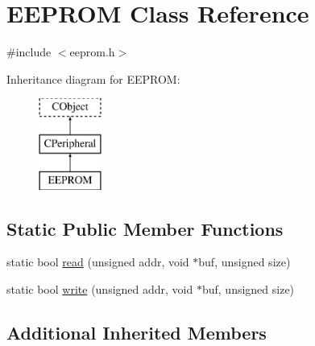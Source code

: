 \hypertarget{class_e_e_p_r_o_m}{\section{E\-E\-P\-R\-O\-M Class Reference}
\label{class_e_e_p_r_o_m}
}


{\ttfamily \#include $<$eeprom.\-h$>$}

Inheritance diagram for E\-E\-P\-R\-O\-M\-:\begin{figure}[H]
\begin{center}
\leavevmode
\includegraphics[height=3.000000cm]{d0/d7a/class_e_e_p_r_o_m}
\end{center}
\end{figure}
\subsection*{Static Public Member Functions}
\begin{DoxyCompactItemize}
\item 
static bool \hyperlink{class_e_e_p_r_o_m_a47f3f52eed97b6e43b830ce4a1dc495e}{read} (unsigned addr, void $\ast$buf, unsigned size)
\item 
static bool \hyperlink{class_e_e_p_r_o_m_a8c397be98d4762869715a2a07866af6b}{write} (unsigned addr, void $\ast$buf, unsigned size)
\end{DoxyCompactItemize}
\subsection*{Additional Inherited Members}


